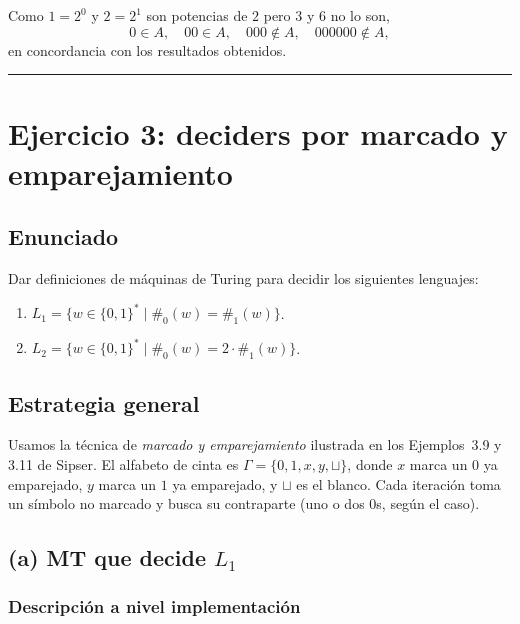 \documentclass[11pt,a4paper]{article}
\theoremstyle{plain}
\theoremstyle{definition}
\theoremstyle{remark}
\newcommand{\countz}{\#_{0}}
\newcommand{\countu}{\#_{1}}
\newcommand{\blank}{\sqcup}
\begin{document}
Como $1=2^0$ y $2=2^1$ son potencias de $2$ pero $3$ y $6$ no lo son,
\[
  0\in A,\quad 00\in A,\quad 000\notin A,\quad 000000\notin A,
\]
en concordancia con los resultados obtenidos.

\bigskip\hrule\bigskip

\section{Ejercicio 3: deciders por marcado y emparejamiento}
\label{sec:ej3}

\subsection*{Enunciado}

Dar definiciones de m\'aquinas de Turing para decidir los siguientes
lenguajes:
\begin{enumerate}
  \item[(a)] $L_1 = \{w\in\{0,1\}^* \mid \countz(w)=\countu(w)\}$.
  \item[(b)] $L_2 = \{w\in\{0,1\}^* \mid \countz(w) = 2\cdot \countu(w)\}$.
\end{enumerate}

\subsection*{Estrategia general}

Usamos la t\'ecnica de \emph{marcado y emparejamiento} ilustrada en los
Ejemplos~3.9 y 3.11 de Sipser. El alfabeto de cinta es
$\Gamma=\{0,1,x,y,\blank\}$, donde $x$ marca un $0$ ya emparejado, $y$ marca
un $1$ ya emparejado, y $\blank$ es el blanco. Cada iteraci\'on toma un
s\'imbolo no marcado y busca su contraparte (uno o dos $0$s, seg\'un el
caso).

\subsection*{(a) MT que decide $L_1$}

\subsubsection*{Descripci\'on a nivel implementaci\'on}
\end{document}

